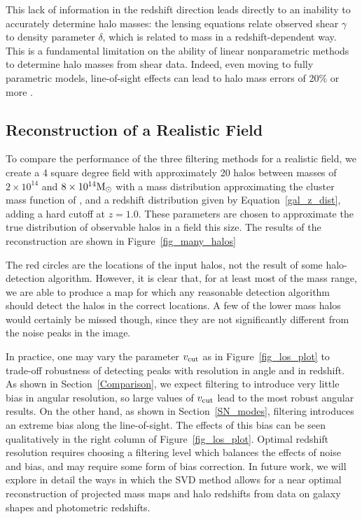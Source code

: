 \documentclass[twocolumn]{emulateapj}
\begin{document}
This lack of information in the redshift direction leads directly 
to an inability to accurately determine halo masses:
the lensing equations relate observed shear $\gamma$ 
to density parameter $\delta$, which is related to mass in a
redshift-dependent way.  This is a fundamental limitation on the
ability of linear nonparametric methods to determine halo masses
from shear data. Indeed, even moving to fully parametric models, 
line-of-sight effects can lead to halo mass errors of 
20\% or more \citep{Hoekstra03, dePutter05}.

\subsection{Reconstruction of a Realistic Field}
\label{Realistic_Field}

To compare the performance of the three filtering methods 
for a realistic field, we
create a 4 square degree field with approximately 20 halos between masses of
$2\times 10^{14}$ and $8\times 10^{14} {\rm M_\odot}$ with a mass 
distribution approximating the cluster mass function of \citet{Rines07},
and a redshift distribution given by Equation~\ref{gal_z_dist},
adding a hard cutoff at $z=1.0$.  
These parameters are chosen to approximate the true 
distribution of observable halos in a field this size.
The results of the reconstruction are shown in 
Figure~\ref{fig_many_halos} 

The red circles are the locations of the input halos, not the result 
of some halo-detection algorithm.  However, it is clear that, 
for at least most of the mass range, we are able to produce a map 
for which any reasonable detection algorithm should detect the halos
in the correct locations.  A few of the lower mass halos would 
certainly be missed though, since they are not significantly 
different from the noise peaks in the image.

In practice, one may vary the parameter $v_{\rm cut}$ as in 
Figure~\ref{fig_los_plot}
to trade-off robustness of detecting peaks with resolution in angle and in 
redshift. As shown in Section~\ref{Comparison}, we expect
filtering to introduce very little bias in angular resolution, 
so large values of $v_{\rm cut}$ lead to the most robust angular results. 
On the other hand, as shown in Section~\ref{SN_modes},
filtering introduces an extreme bias along the line-of-sight.
The effects of this bias can be seen qualitatively
in the right column of Figure~\ref{fig_los_plot}.
Optimal redshift resolution requires choosing a 
filtering level which balances the effects of noise and bias,
and may require some form of bias correction.  In future work, we will
explore in detail the ways in which the SVD method allows
for a near optimal reconstruction of projected mass maps
and halo redshifts from data on galaxy shapes and photometric redshifts. 
\end{document}
